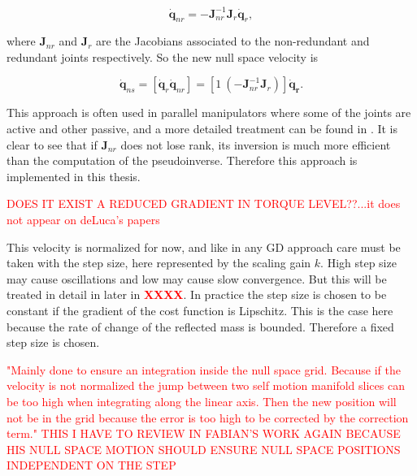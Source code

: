 \begin{equation}
\dot{\mathbf{q}}_{nr} =  - \mathbf{J}_{nr}^{-1} \mathbf{J}_r \mathbf{\dot{q}}_r    ,
\label{eq:ns_constraint}
\end{equation}

where $\mathbf{J}_{nr}$ and $\mathbf{J}_{r}$ are the Jacobians associated to the non-redundant and redundant joints respectively. So the new null space velocity is

\begin{equation}
\mathbf{\dot{q}}_{ns} = \left[\mathbf{\dot{q}}_{r}  \mathbf{\dot{q}}_{nr} \right ] 
= \left[1 \ (-\mathbf{J}_{nr}^{-1} \mathbf{J}_r)  \right ]  \mathbf{\dot{q}_r}.
\label{eq:ns_velocity_RG}
\end{equation}

This approach is often used in parallel manipulators where some of the joints are active and other passive, and a more detailed treatment can be found in \cite{Murray:1994:MIR:561828}. It is clear to see that if $\mathbf{J}_{nr}$ does not lose rank, its inversion is much more efficient than the computation of the pseudoinverse. Therefore this approach is implemented in this thesis.

\textcolor{red}{DOES IT EXIST A REDUCED GRADIENT IN TORQUE LEVEL??...it does not appear on deLuca's papers}

This velocity is normalized for now, and like in any GD approach care must be taken with the step size, here represented by the scaling gain $k$. High step size may cause oscillations and low may cause slow convergence. But this will be treated in detail in later in \textcolor{red}{\textbf{XXXX}}.  In practice the step size is chosen to be constant if the gradient of the cost function is Lipschitz. This is the case here because the rate of change of the reflected mass is bounded. Therefore a fixed step size is chosen.

\textcolor{red}{"Mainly done to ensure an integration inside the null space grid. Because if the velocity is not normalized the jump between two self motion manifold slices can be too high when integrating along the linear axis. Then the new position will not be in the grid because the error is too high to be corrected by the correction term." THIS I HAVE TO REVIEW IN FABIAN'S WORK AGAIN BECAUSE HIS NULL SPACE MOTION SHOULD ENSURE NULL SPACE POSITIONS INDEPENDENT ON THE STEP}




%

